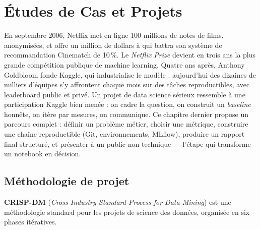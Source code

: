 \chapter{\'Etudes de Cas et Projets}
\label{ch:projets}

En septembre 2006, Netflix met en ligne 100 millions de notes de films, anonymisées, et offre un million de dollars à qui battra son système de recommandation Cinematch de 10\,\%. Le \emph{Netflix Prize} devient en trois ans la plus grande compétition publique de machine learning. Quatre ans après, Anthony Goldbloom fonde Kaggle, qui industrialise le modèle : aujourd'hui des dizaines de milliers d'équipes s'y affrontent chaque mois sur des tâches reproductibles, avec leaderboard public et privé. Un projet de data science sérieux ressemble à une participation Kaggle bien menée : on cadre la question, on construit un \emph{baseline} honnête, on itère par mesures, on communique. Ce chapitre dernier propose un parcours complet : définir un problème métier, choisir une métrique, construire une chaîne reproductible (Git, environnements, MLflow), produire un rapport final structuré, et présenter à un public non technique --- l'étape qui transforme un notebook en décision.

\section{M\'ethodologie de projet}
\label{sec:methodologie}


\begin{definition}[CRISP-DM]
\textbf{CRISP-DM} (\textit{Cross-Industry Standard Process for Data Mining}) est une m\'ethodologie standard pour les projets de science des donn\'ees, organis\'ee en six phases it\'eratives.
\end{definition}

